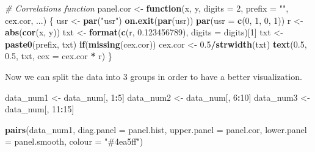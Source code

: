 \documentclass[
]{article}
\newenvironment{Shaded}{\begin{snugshade}}{\end{snugshade}}
\newcommand{\AttributeTok}[1]{\textcolor[rgb]{0.13,0.29,0.53}{#1}}
\newcommand{\CommentTok}[1]{\textcolor[rgb]{0.56,0.35,0.01}{\textit{#1}}}
\newcommand{\ControlFlowTok}[1]{\textcolor[rgb]{0.13,0.29,0.53}{\textbf{#1}}}
\newcommand{\DecValTok}[1]{\textcolor[rgb]{0.00,0.00,0.81}{#1}}
\newcommand{\FloatTok}[1]{\textcolor[rgb]{0.00,0.00,0.81}{#1}}
\newcommand{\FunctionTok}[1]{\textcolor[rgb]{0.13,0.29,0.53}{\textbf{#1}}}
\newcommand{\NormalTok}[1]{#1}
\newcommand{\OtherTok}[1]{\textcolor[rgb]{0.56,0.35,0.01}{#1}}
\newcommand{\SpecialCharTok}[1]{\textcolor[rgb]{0.81,0.36,0.00}{\textbf{#1}}}
\newcommand{\StringTok}[1]{\textcolor[rgb]{0.31,0.60,0.02}{#1}}
\begin{document}
\begin{Shaded}
\begin{Highlighting}[]
\CommentTok{\# Correlations function}
\NormalTok{panel.cor }\OtherTok{\textless{}{-}} \ControlFlowTok{function}\NormalTok{(x, y, }\AttributeTok{digits =} \DecValTok{2}\NormalTok{, }\AttributeTok{prefix =} \StringTok{""}\NormalTok{, cex.cor, ...)}
\NormalTok{\{}
\NormalTok{  usr }\OtherTok{\textless{}{-}} \FunctionTok{par}\NormalTok{(}\StringTok{"usr"}\NormalTok{)}
  \FunctionTok{on.exit}\NormalTok{(}\FunctionTok{par}\NormalTok{(usr))}
  \FunctionTok{par}\NormalTok{(}\AttributeTok{usr =} \FunctionTok{c}\NormalTok{(}\DecValTok{0}\NormalTok{, }\DecValTok{1}\NormalTok{, }\DecValTok{0}\NormalTok{, }\DecValTok{1}\NormalTok{))}
\NormalTok{  r }\OtherTok{\textless{}{-}} \FunctionTok{abs}\NormalTok{(}\FunctionTok{cor}\NormalTok{(x, y))}
\NormalTok{  txt }\OtherTok{\textless{}{-}} \FunctionTok{format}\NormalTok{(}\FunctionTok{c}\NormalTok{(r, }\FloatTok{0.123456789}\NormalTok{), }\AttributeTok{digits =}\NormalTok{ digits)[}\DecValTok{1}\NormalTok{]}
\NormalTok{  txt }\OtherTok{\textless{}{-}} \FunctionTok{paste0}\NormalTok{(prefix, txt)}
  \ControlFlowTok{if}\NormalTok{(}\FunctionTok{missing}\NormalTok{(cex.cor)) cex.cor }\OtherTok{\textless{}{-}} \FloatTok{0.5}\SpecialCharTok{/}\FunctionTok{strwidth}\NormalTok{(txt)}
  \FunctionTok{text}\NormalTok{(}\FloatTok{0.5}\NormalTok{, }\FloatTok{0.5}\NormalTok{, txt, }\AttributeTok{cex =}\NormalTok{ cex.cor }\SpecialCharTok{*}\NormalTok{ r)}
\NormalTok{\}}
\end{Highlighting}
\end{Shaded}

Now we can split the data into 3 groups in order to have a better
visualization.

\begin{Shaded}
\begin{Highlighting}[]
\NormalTok{data\_num1 }\OtherTok{\textless{}{-}}\NormalTok{ data\_num[, }\DecValTok{1}\SpecialCharTok{:}\DecValTok{5}\NormalTok{]}
\NormalTok{data\_num2 }\OtherTok{\textless{}{-}}\NormalTok{ data\_num[, }\DecValTok{6}\SpecialCharTok{:}\DecValTok{10}\NormalTok{]}
\NormalTok{data\_num3 }\OtherTok{\textless{}{-}}\NormalTok{ data\_num[, }\DecValTok{11}\SpecialCharTok{:}\DecValTok{15}\NormalTok{]}

\FunctionTok{pairs}\NormalTok{(data\_num1, }
      \AttributeTok{diag.panel =}\NormalTok{ panel.hist,}
      \AttributeTok{upper.panel =}\NormalTok{ panel.cor, }
      \AttributeTok{lower.panel =}\NormalTok{ panel.smooth,}
      \AttributeTok{colour =} \StringTok{"\#4ea5ff"}\NormalTok{)}
\end{Highlighting}
\end{Shaded}
\end{document}
